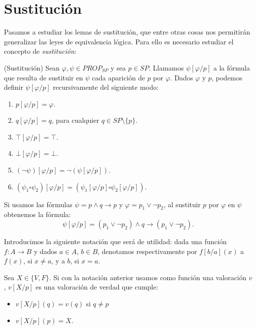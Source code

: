 \section{Sustitución}

Pasamos a estudiar los lemas de sustitución, que entre otras cosas nos permitirán generalizar las leyes de equivalencia lógica.
Para ello es necesario estudiar el concepto de \textit{sustitución}:


\begin{definition}\label{def:sust}(Sustitución) Sean $\varphi, \psi \in PROP_{SP}$ y sea $p \in SP$. Llamamos $\psi[\varphi / p]$ a la fórmula que resulta de sustituir en $\psi$ cada aparición de $p$ por $\varphi$. Dados $\varphi$ y $p$, podemos definir $\psi[\varphi / p]$ recursivamente del siguiente modo:
\begin{enumerate}
    \item $p[\varphi/p] = \varphi$.
    \item $q[\varphi/p] = q$, para cualquier $q \in SP \setminus \{p\}$.
    \item $\top[\varphi/p] = \top$.
    \item $\bot[\varphi/p] = \bot$.
    \item $(\neg\psi)[\varphi/p] = \neg(\psi[\varphi/p])$.
    \item $(\psi_1 \square \psi_2)[\varphi/p] = (\psi_1[\varphi/p] \square \psi_2[\varphi/p])$.
\end{enumerate}
\end{definition}

\begin{example}
Si usamos las fórmulas $\psi=p\land q\to p$ y $\varphi=p_1\lor\neg p_2$, al sustituir $p$ por $\varphi$ en $\psi$ obtenemos la fórmula:
\[\psi[\varphi/p]=(p_1\lor\neg p_2)\land q\to (p_1\lor\neg p_2).\]
\end{example}

Introducimos la siguiente notación que será de utilidad: dada una función $f:A \rightarrow B$ y dados $a\in A$, $b \in B$, denotamos respectivamente por $f[b/a](x)$ a $f(x)$, si $x \neq a$, y a $b$, si $x = a$.

\begin{example}
Sea $X\in \{V,F\}$. Si con la notación anterior usamos como función una valoración $v$, $v[X/p]$ es una valoración de verdad que cumple:
\begin{itemize}
\item $v[X/p](q)=v(q)$ si $q\neq p$
\item $v[X/p](p)=X$.
\end{itemize}
\end{example}

